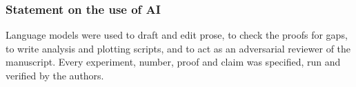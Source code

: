 \documentclass{article}
\theoremstyle{remark}
\begin{document}
\subsubsection*{Statement on the use of AI}
Language models were used to draft and edit prose, to check the proofs for gaps, to write analysis and plotting
scripts, and to act as an adversarial reviewer of the manuscript. Every experiment, number, proof and claim was
specified, run and verified by the authors.

\clearpage



\appendix

\end{document}
